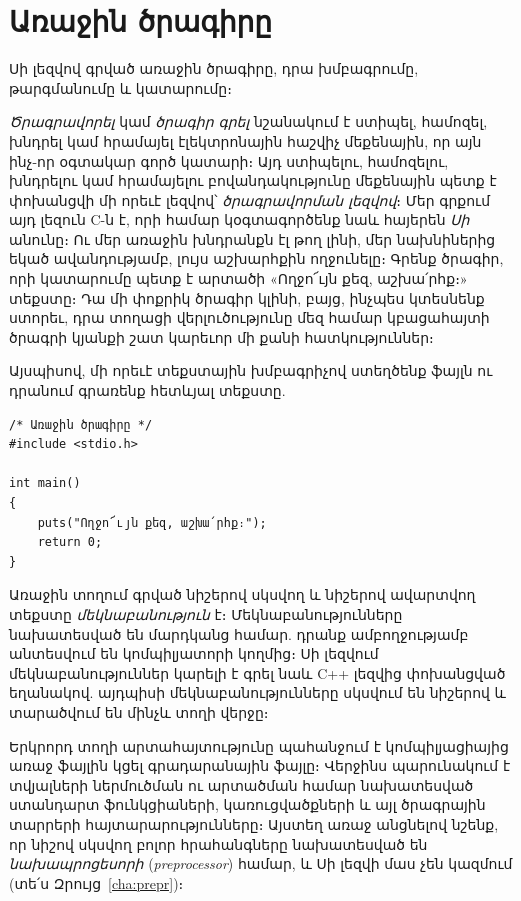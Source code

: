 \chapter{Առաջին ծրագիրը}

\begin{epigraph}
Սի լեզվով գրված առաջին ծրագիրը, դրա խմբագրումը,
թարգմանումը և կատարումը։
\end{epigraph}


\emph{Ծրագրավորել} կամ \emph{ծրագիր գրել} նշանակում է ստիպել,
համոզել, խնդրել կամ հրամայել էլեկտրոնային հաշվիչ մեքենային, 
որ այն ինչ-որ օգտակար գործ կատարի։ Այդ ստիպելու, համոզելու, 
խնդրելու կամ հրամայելու բովանդակությունը մեքենային պետք է 
փոխանցվի մի որեւէ լեզվով՝ \emph{ծրագրավորման լեզվով}։ Մեր 
գրքում այդ լեզուն C-ն է, որի համար կօգտագործենք նաև հայերեն 
\emph{Սի} անունը։ Ու մեր առաջին խնդրանքն էլ թող լինի, մեր 
նախնիներից եկած ավանդությամբ, լույս աշխարհքին ողջունելը։ Գրենք 
ծրագիր, որի կատարումը պետք է արտածի «Ողջո՜ւյն քեզ, աշխա՛րհք։» 
տեքստը։ Դա մի փոքրիկ ծրագիր կլինի, բայց, ինչպես կտեսնենք ստորեւ, 
դրա տողացի վերլուծությունը մեզ համար կբացահայտի ծրագրի կյանքի 
շատ կարեւոր մի քանի հատկություններ։

Այսպիսով, մի որեւէ տեքստային խմբագրիչով ստեղծենք 
ֆայլն ու դրանում գրառենք հետևյալ տեքստը.

\begin{Verbatim}
/* Առաջին ծրագիրը */
#include <stdio.h>

int main()
{
    puts("Ողջո՜ւյն քեզ, աշխա՛րհք։");
    return 0;
}
\end{Verbatim}

Առաջին տողում գրված \code{/*} նիշերով սկսվող և \code{*/} նիշերով
ավարտվող տեքստը \emph{մեկնաբանություն} է։
Մեկնաբանությունները նախատեսված են մարդկանց համար. դրանք
ամբողջությամբ անտեսվում են կոմպիլյատորի կողմից։ Սի լեզվում
մեկնաբանություններ կարելի է գրել նաև C++ լեզվից փոխանցված եղանակով.
այդպիսի մեկնաբանությունները սկսվում են \code{//} նիշերով և տարածվում
են մինչև տողի վերջը։

Երկրորդ տողի  արտահայտությունը պահանջում
է կոմպիլյացիայից առաջ  ֆայլին կցել գրադարանային
 ֆայլը։ Վերջինս պարունակում է տվյալների ներմուծման ու
արտածման համար նախատեսված ստանդարտ ֆունկցիաների, կառուցվածքների և
այլ ծրագրային տարրերի հայտարարությունները։ Այստեղ առաջ անցնելով
նշենք, որ \code{\#} նիշով սկսվող բոլոր հրահանգները նախատեսված են
\emph{նախապրոցեսորի} (\emph{preprocessor}) համար,
և Սի լեզվի մաս չեն կազմում (տե՛ս Զրույց~\ref{cha:prepr})։

